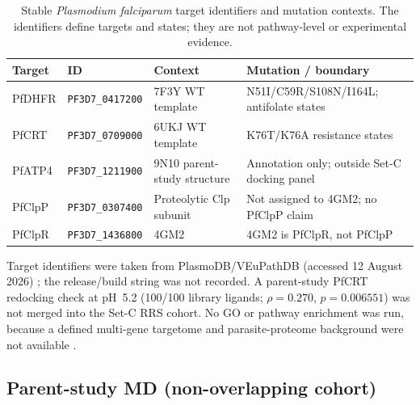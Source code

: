 \documentclass[journal=jcisd8,manuscript=suppinfo,layout=traditional]{achemso}
\begin{document}
\begin{table}[htbp]
\centering
\scriptsize
\setlength{\tabcolsep}{0pt}
\caption{Stable \textit{Plasmodium falciparum} target identifiers and mutation contexts. The identifiers define targets and states; they are not pathway-level or experimental evidence.}
\label{tab:s5_plasmodb}
\begin{tabularx}{\textwidth}{>{\raggedright\arraybackslash}p{} >{\raggedright\arraybackslash}p{} >{\raggedright\arraybackslash}p{} X}
\toprule
Target & ID & Context & Mutation / boundary \\
\midrule
PfDHFR & \scriptsize\texttt{PF3D7\_0417200}\normalsize & 7F3Y WT template & N51I/C59R/S108N/I164L; antifolate states \\
PfCRT & \scriptsize\texttt{PF3D7\_0709000}\normalsize & 6UKJ WT template & K76T/K76A resistance states \\
PfATP4 & \scriptsize\texttt{PF3D7\_1211900}\normalsize & 9N10 parent-study structure & Annotation only; outside Set-C docking panel \\
PfClpP & \scriptsize\texttt{PF3D7\_0307400}\normalsize & Proteolytic Clp subunit & Not assigned to 4GM2; no PfClpP claim \\
PfClpR & \scriptsize\texttt{PF3D7\_1436800}\normalsize & 4GM2 & 4GM2 is PfClpR, not PfClpP \\
\bottomrule
\end{tabularx}
\normalsize
\setlength{\tabcolsep}{6pt}
\end{table}

Target identifiers were taken from PlasmoDB/VEuPathDB (accessed 12 August 2026) \citep{plasmodb_2026}; the release/build string was not recorded. A parent-study PfCRT redocking check at pH~5.2 (100/100 library ligands; $\rho = 0.270$, $p = 0.006551$) was not merged into the Set-C RRS cohort. No GO or pathway enrichment was run, because a defined multi-gene targetome and parasite-proteome background were not available \citep{Trapotsi2022MoA}.


\subsection*{Parent-study MD (non-overlapping cohort)}
\end{document}
